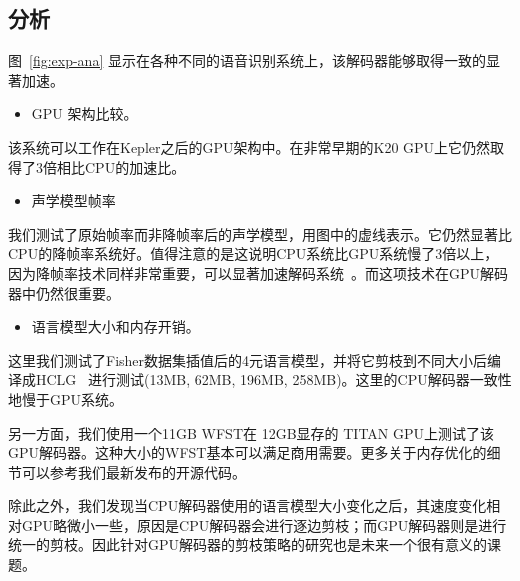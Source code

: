 \vspace{-0.25em}
\subsection{分析}
\vspace{-0.25em}
\label{sec:exp-ana}

图~\ref{fig:exp-ana} 显示在各种不同的语音识别系统上，该解码器能够取得一致的显著加速。

\begin{itemize} 
   \item GPU 架构比较。
 \end{itemize} 
 该系统可以工作在Kepler之后的GPU架构中。在非常早期的K20 GPU上它仍然取得了3倍相比CPU的加速比。
 \begin{itemize} 
   \item 声学模型帧率
 \end{itemize} 
 我们测试了原始帧率而非降帧率后的声学模型，用图中的虚线表示。它仍然显著比CPU的降帧率系统好。值得注意的是这说明CPU系统比GPU系统慢了3倍以上，因为降帧率技术同样非常重要，可以显著加速解码系统~\cite{pundak2016lower,zhc00-chen-tasl2017}。而这项技术在GPU解码器中仍然很重要。
\begin{itemize}
   \item 语言模型大小和内存开销。
 \end{itemize} 
 这里我们测试了Fisher数据集插值后的4元语言模型，并将它剪枝到不同大小后编译成HCLG~\cite{mohri2002weighted} 进行测试(13MB, 62MB, 196MB, 258MB)。这里的CPU解码器一致性地慢于GPU系统。

 另一方面，我们使用一个11GB WFST在 12GB显存的 TITAN GPU上测试了该GPU解码器。这种大小的WFST基本可以满足商用需要。更多关于内存优化的细节可以参考我们最新发布的开源代码。

 除此之外，我们发现当CPU解码器使用的语言模型大小变化之后，其速度变化相对GPU略微小一些，原因是CPU解码器会进行逐边剪枝；而GPU解码器则是进行统一的剪枝。因此针对GPU解码器的剪枝策略的研究也是未来一个很有意义的课题。







